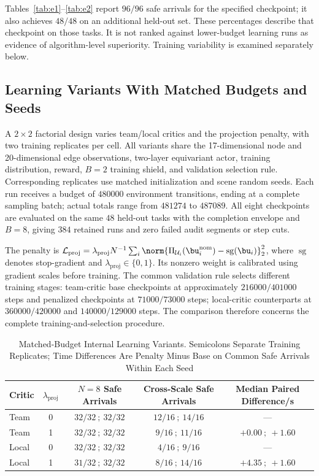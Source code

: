 Tables~\ref{tab:e1}--\ref{tab:e2} report $96/96$ safe arrivals for the specified checkpoint; it also achieves $48/48$ on an additional held-out set. These percentages describe that checkpoint on those tasks. It is not ranked against lower-budget learning runs as evidence of algorithm-level superiority. Training variability is examined separately below.

\subsection{Learning Variants With Matched Budgets and Seeds}\label{subsec:matched}
A $2\times2$ factorial design varies team/local critics and the projection penalty, with two training replicates per cell. All variants share the 17-dimensional node and 20-dimensional edge observations, two-layer equivariant actor, training distribution, reward, $B=2$ training shield, and validation selection rule. Corresponding replicates use matched initialization and scene random seeds. Each run receives a budget of $480000$ environment transitions, ending at a complete sampling batch; actual totals range from $481274$ to $487089$. All eight checkpoints are evaluated on the same $48$ held-out tasks with the completion envelope and $B=8$, giving $384$ retained runs and zero failed audit segments or step cuts.

The penalty is $\mathcal L_{\mathrm{proj}}=\lambda_{\mathrm{proj}}N^{-1}\sum_i\norm{\Pi_{\mathcal U_i}(\bu_i^{\mathrm{nom}})-\operatorname{sg}(\bu_i)}_2^2$, where $\operatorname{sg}$ denotes stop-gradient and $\lambda_{\mathrm{proj}}\in\{0,1\}$. Its nonzero weight is calibrated using gradient scales before training. The common validation rule selects different training stages: team-critic base checkpoints at approximately $216000/401000$ steps and penalized checkpoints at $71000/73000$ steps; local-critic counterparts at $360000/420000$ and $140000/129000$ steps. The comparison therefore concerns the complete training-and-selection procedure.

\begin{table}[t]
\centering\footnotesize
\caption{Matched-Budget Internal Learning Variants. Semicolons Separate Training Replicates; Time Differences Are Penalty Minus Base on Common Safe Arrivals Within Each Seed}\label{tab:matched}
\begin{tabularx}{\textwidth}{@{}Xcccc@{}}\toprule
Critic & $\lambda_{\mathrm{proj}}$ & $N=8$ Safe Arrivals & Cross-Scale Safe Arrivals & Median Paired Difference/s\\\midrule
Team & 0 & $32/32\ ;\ 32/32$ & $12/16\ ;\ 14/16$ & --- \\
Team & 1 & $32/32\ ;\ 32/32$ & $9/16\ ;\ 11/16$ & $+0.00\ ;\ +1.60$ \\
Local & 0 & $32/32\ ;\ 32/32$ & $4/16\ ;\ 9/16$ & --- \\
Local & 1 & $31/32\ ;\ 32/32$ & $8/16\ ;\ 14/16$ & $+4.35\ ;\ +1.60$ \\
\bottomrule\end{tabularx}
\end{table}

